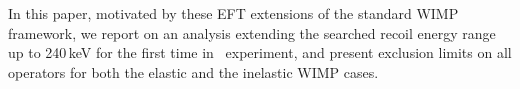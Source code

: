 In this paper, motivated by these EFT extensions of the standard WIMP framework, we report on an analysis extending the searched recoil energy range up to 240\,keV for the first time in \Xehund\ experiment, and present exclusion limits on all operators for both the elastic and the inelastic WIMP cases.     


